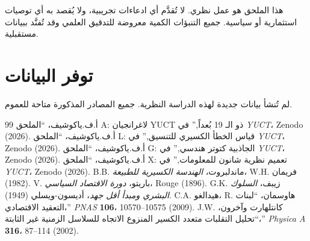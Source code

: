 \documentclass[12pt,a4paper]{article}
\theoremstyle{remark}
\begin{document}
	هذا الملحق هو عمل نظري. لا تُقدَّم أي ادعاءات تجريبية، ولا يُقصد به أي توصيات استثمارية أو سياسية. جميع التنبؤات الكمية معروضة للتدقيق العلمي وقد تُفنَّد ببيانات مستقبلية.
	
	\section*{توفر البيانات}
	
	لم تُنشأ بيانات جديدة لهذه الدراسة النظرية. جميع المصادر المذكورة متاحة للعموم.
	
	\begin{thebibliography}{99}
		 أ.ف.ياكوشيف، ``الملحق A: لاغرانجيان YUCT ذو الـ 19 بُعداً,'' في \emph{YUCT}، Zenodo (2026).
		 أ.ف.ياكوشيف، ``الملحق L: قياس الخطأ الكسيري للتنسيق,'' في \emph{YUCT}، Zenodo (2026).
		 أ.ف.ياكوشيف، ``الملحق G: الجاذبية كتوتر هندسي,'' في \emph{YUCT}، Zenodo (2026).
		 أ.ف.ياكوشيف، ``الملحق X: تعميم نظرية شانون للمعلومات,'' في \emph{YUCT}، Zenodo (2026).
		 B.B. ماندلبروت، \emph{الهندسة الكسيرية للطبيعة}، W.H. فريمان (1982).
		 V. باريتو، \emph{دورة الاقتصاد السياسي}، Rouge (1896).
		 G.K. زيبف، \emph{السلوك البشري ومبدأ أقل جهد}، أديسون-ويسلي (1949).
		 C.A. هيدالغو، R. هاوسمان، ``لبنات التعقيد الاقتصادي،'' \emph{PNAS} \textbf{106}، 10570–10575 (2009).
		 J.W. كانتلهارت وآخرون، ``تحليل التقلبات متعدد الكسير المنزوع الاتجاه للسلاسل الزمنية غير الثابتة،'' \emph{Physica A} \textbf{316}، 87–114 (2002).
	\end{thebibliography}
	
\end{document}
